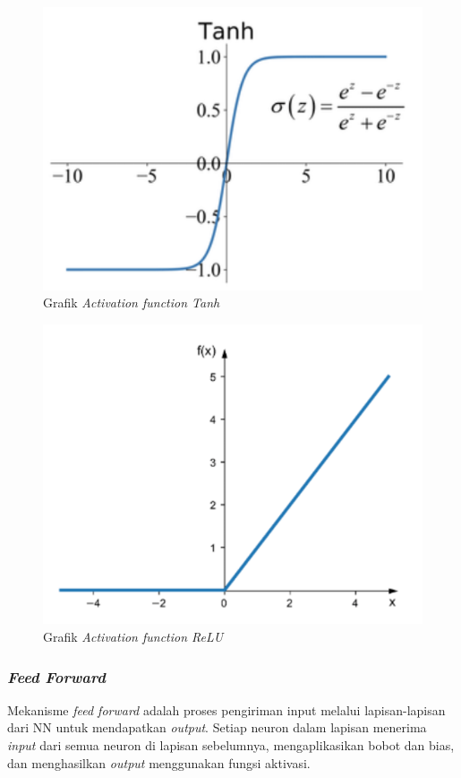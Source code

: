   \begin{figure}[H]
    \centering
    \includegraphics[scale=0.8]{gambar/bab2-grafik-tanh.png}
    \caption{Grafik \emph{Activation function Tanh}}
    \label{fig:tanh_function}
  \end{figure}

  \begin{figure}[H]
    \centering
    \includegraphics[scale=0.5]{gambar/bab2-grafik-relu.png}
    \caption{Grafik \emph{Activation function ReLU}}
    \label{fig:relu_function}
  \end{figure}
 
 \subsubsection{\emph{Feed Forward}}
 Mekanisme \emph{feed forward} adalah proses pengiriman input melalui lapisan-lapisan dari NN untuk mendapatkan \emph{output}. Setiap neuron dalam lapisan menerima \emph{input} dari semua neuron di lapisan sebelumnya, mengaplikasikan bobot dan bias, dan menghasilkan \emph{output} menggunakan fungsi aktivasi.
 
